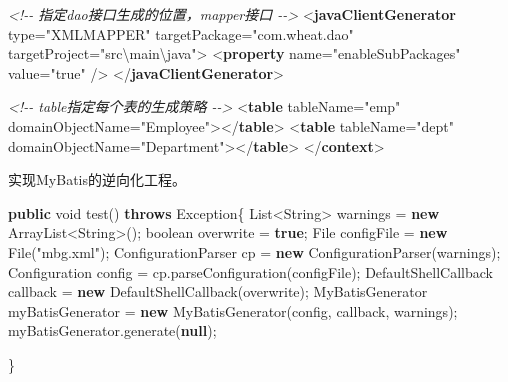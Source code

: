 \documentclass[
]{article}
\newenvironment{Shaded}{}{}
\newcommand{\BuiltInTok}[1]{#1}
\newcommand{\CommentTok}[1]{\textcolor[rgb]{0.38,0.63,0.69}{\textit{#1}}}
\newcommand{\DataTypeTok}[1]{\textcolor[rgb]{0.56,0.13,0.00}{#1}}
\newcommand{\FunctionTok}[1]{\textcolor[rgb]{0.02,0.16,0.49}{#1}}
\newcommand{\KeywordTok}[1]{\textcolor[rgb]{0.00,0.44,0.13}{\textbf{#1}}}
\newcommand{\NormalTok}[1]{#1}
\newcommand{\OperatorTok}[1]{\textcolor[rgb]{0.40,0.40,0.40}{#1}}
\newcommand{\OtherTok}[1]{\textcolor[rgb]{0.00,0.44,0.13}{#1}}
\newcommand{\StringTok}[1]{\textcolor[rgb]{0.25,0.44,0.63}{#1}}
\begin{document}
\begin{Shaded}
\begin{Highlighting}[]
		\CommentTok{\textless{}!{-}{-} 指定dao接口生成的位置，mapper接口 {-}{-}\textgreater{}}
\NormalTok{		\textless{}}\KeywordTok{javaClientGenerator}\OtherTok{ type=}\StringTok{"XMLMAPPER"}
\OtherTok{			targetPackage=}\StringTok{"com.wheat.dao"}\OtherTok{ targetProject=}\StringTok{"src\textbackslash{}main\textbackslash{}java"}\NormalTok{\textgreater{}}
\NormalTok{			\textless{}}\KeywordTok{property}\OtherTok{ name=}\StringTok{"enableSubPackages"}\OtherTok{ value=}\StringTok{"true"}\NormalTok{ /\textgreater{}}
\NormalTok{		\textless{}/}\KeywordTok{javaClientGenerator}\NormalTok{\textgreater{}}


		\CommentTok{\textless{}!{-}{-} table指定每个表的生成策略 {-}{-}\textgreater{}}
\NormalTok{		\textless{}}\KeywordTok{table}\OtherTok{ tableName=}\StringTok{"emp"}\OtherTok{ domainObjectName=}\StringTok{"Employee"}\NormalTok{\textgreater{}\textless{}/}\KeywordTok{table}\NormalTok{\textgreater{}}
\NormalTok{		\textless{}}\KeywordTok{table}\OtherTok{ tableName=}\StringTok{"dept"}\OtherTok{ domainObjectName=}\StringTok{"Department"}\NormalTok{\textgreater{}\textless{}/}\KeywordTok{table}\NormalTok{\textgreater{}}
\NormalTok{	\textless{}/}\KeywordTok{context}\NormalTok{\textgreater{}}
\end{Highlighting}
\end{Shaded}

实现MyBatis的逆向化工程。

\begin{Shaded}
\begin{Highlighting}[]
\KeywordTok{public} \DataTypeTok{void} \FunctionTok{test}\OperatorTok{()} \KeywordTok{throws} \BuiltInTok{Exception}\OperatorTok{\{}
        \BuiltInTok{List}\OperatorTok{\textless{}}\BuiltInTok{String}\OperatorTok{\textgreater{}}\NormalTok{ warnings }\OperatorTok{=} \KeywordTok{new} \BuiltInTok{ArrayList}\OperatorTok{\textless{}}\BuiltInTok{String}\OperatorTok{\textgreater{}();}
        \DataTypeTok{boolean}\NormalTok{ overwrite }\OperatorTok{=} \KeywordTok{true}\OperatorTok{;}
        \BuiltInTok{File}\NormalTok{ configFile }\OperatorTok{=} \KeywordTok{new} \BuiltInTok{File}\OperatorTok{(}\StringTok{"mbg.xml"}\OperatorTok{);}
\NormalTok{        ConfigurationParser cp }\OperatorTok{=} \KeywordTok{new} \FunctionTok{ConfigurationParser}\OperatorTok{(}\NormalTok{warnings}\OperatorTok{);}
        \BuiltInTok{Configuration}\NormalTok{ config }\OperatorTok{=}\NormalTok{ cp}\OperatorTok{.}\FunctionTok{parseConfiguration}\OperatorTok{(}\NormalTok{configFile}\OperatorTok{);}
\NormalTok{        DefaultShellCallback callback }\OperatorTok{=} \KeywordTok{new} \FunctionTok{DefaultShellCallback}\OperatorTok{(}\NormalTok{overwrite}\OperatorTok{);}
\NormalTok{        MyBatisGenerator myBatisGenerator }\OperatorTok{=} \KeywordTok{new} \FunctionTok{MyBatisGenerator}\OperatorTok{(}\NormalTok{config}\OperatorTok{,}
\NormalTok{                callback}\OperatorTok{,}\NormalTok{ warnings}\OperatorTok{);}
\NormalTok{        myBatisGenerator}\OperatorTok{.}\FunctionTok{generate}\OperatorTok{(}\KeywordTok{null}\OperatorTok{);}

    \OperatorTok{\}}
\end{Highlighting}
\end{Shaded}
\end{document}
